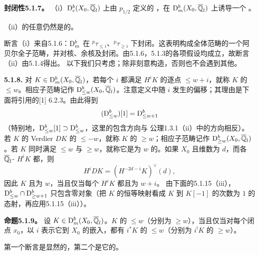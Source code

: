 \par\medskip\noindent\textbf{封闭性5.1.7。} （i）$\mathrm{D}_c^b(X_0,\overline{\mathbb Q}_l)$ 上由 $p_{1/2}$ 定义的 ，在 $\mathrm{D}_m^b(X_0,\overline{\mathbb Q}_l)$ 上诱导一个 。

（ii）的任意仍然是的。

断言（i）来自5.1.6：$\mathrm{D}_m^b$ 在 ${}^p\tau_{\le i}$、${}^p\tau_{\ge i}$ 下封闭。这表明构成全体范畴的一个阿贝尔全子范畴，并对核、余核及封闭。由5.1.6，5.1.3的各项假设均成立，故断言（ii）由5.1.4得出。
以下我们只考虑；除非刻意构造，否则也不会遇到其他。

\par\medskip\noindent\textbf{5.1.8.} 对 $K\in\mathrm{D}_m^b(X_0,\overline{\mathbb Q}_l)$，若每个 $i$ 都满足 $H^iK$ 的逐点 $\le w+i$，就称 $K$ 的 $\le w$。相应子范畴记作 $\mathrm{D}_{\le w}^b(X_0,\overline{\mathbb Q}_l)$。注意定义中随 $i$ 发生的偏移；其理由是下面将引用的[1] 6.2.3。由此得到
\[
(\mathrm{D}_{\le w}^b)[1]=\mathrm{D}_{\le w+1}^b
\]
（特别地，$\mathrm{D}_{\le w}^b[1]\supset\mathrm{D}_{\le w}^b$，这里的包含方向与 公理1.3.1（ii）中的方向相反）。
若 $K$ 的 Verdier  $DK$ 的 $\le-w$，就称 $K$ 的 $\ge w$；相应子范畴记作 $\mathrm{D}_{\ge w}^b(X_0,\overline{\mathbb Q}_l)$。若 $K$ 同时满足 $\le w$ 与 $\ge w$，就称它是为 $w$ 的。如果 $X_0$ 且维数为 $d$，而各 $\overline{\mathbb Q}_l$- $H^iK$ 都，则
\[
H^iDK=(H^{-2d-i}K)^\vee(d),
\]
因此 $K$ 且为 $w$，当且仅当每个 $H^iK$ 都且为 $w+i$。
由下面的5.1.15（iii），$\mathrm{D}_{\le w}^b\cap\mathrm{D}_{\ge w+1}^b$ 只包含零对象（把 $K$ 的恒等映射看成 $K$ 到 $K[-1]$ 的次数为 $1$ 的态射，再应用5.1.15（iii））。

\par\medskip\noindent\textbf{命题5.1.9。} 设 $K\in\mathrm{D}_m^b(X_0,\overline{\mathbb Q}_l)$。$K$ 的 $\le w$（分别为 $\ge w$），当且仅当对每个闭点 $x_0$，以 $i$ 表示它到 $X_0$ 的嵌入，都有 $i^*K$ 的 $\le w$（分别为 $i^!K$ 的 $\ge w$）。

第一个断言是显然的，第二个是它的。

